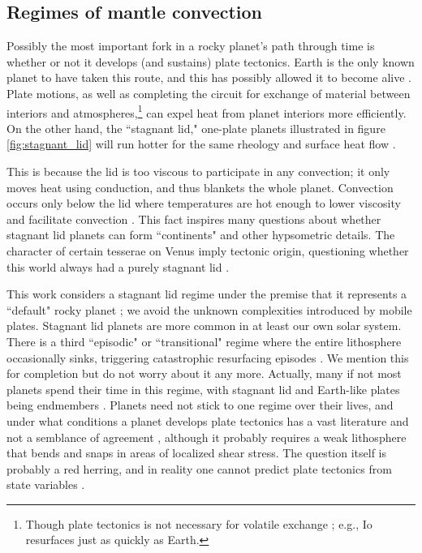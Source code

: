 \subsection{Regimes of mantle convection}

Possibly the most important fork in a rocky planet's path through time is whether or not it develops (and sustains) plate tectonics. Earth is the only known planet to have taken this route, and this has possibly allowed it to become alive \citep[see][]{Lenardic2016}. Plate motions, as well as completing the circuit for exchange of material between interiors and atmospheres,\footnote{Though plate tectonics is not necessary for volatile exchange \citep{Lenardic2018}; e.g., Io resurfaces just as quickly as Earth.} can expel heat from planet interiors more efficiently. On the other hand, the ``stagnant lid," one-plate planets illustrated in figure \ref{fig:stagnant_lid} will run hotter for the same rheology and surface heat flow \citep[e.g.,][]{Stevenson2003}. 

This is because the lid is too viscous to participate in any convection; it only moves heat using conduction, and thus blankets the whole planet. Convection occurs only below the lid where temperatures are hot enough to lower viscosity and facilitate convection \citep{Morris1984, Christensen1984, Hansen1993, Solomatov1995}. This fact inspires many questions about whether stagnant lid planets can form ``continents" and other hypsometric details. The character of certain tesserae on Venus imply tectonic origin, questioning whether this world always had a purely stagnant lid \citep{Bindschadler1991, Lenardic1991}.

This work considers a stagnant lid regime under the premise that it represents a ``default" rocky planet \citep{ORourke2012}; we avoid the unknown complexities introduced by mobile plates. Stagnant lid planets are more common in at least our own solar system. There is a third ``episodic" or ``transitional" regime where the entire lithosphere occasionally sinks, triggering catastrophic resurfacing episodes \citep{Moresi1998}. We mention this for completion but do not worry about it any more. Actually, many if not most planets spend their time in this regime, with stagnant lid and Earth-like plates being endmembers \citep{Foley2014}. Planets need not stick to one regime over their lives, and under what conditions a planet develops plate tectonics has a vast literature and not a semblance of agreement \citep[e.g.,][]{Valencia2007, ONeill2007, Foley2012, Tackley2013, Noack2014a, Korenaga2010, Miyagoshi2018}, although it probably requires a weak lithosphere that bends and snaps in areas of localized shear stress. The question itself is probably a red herring, and in reality one cannot predict plate tectonics from state variables \citep{Lenardic2016, Weller2018}.



